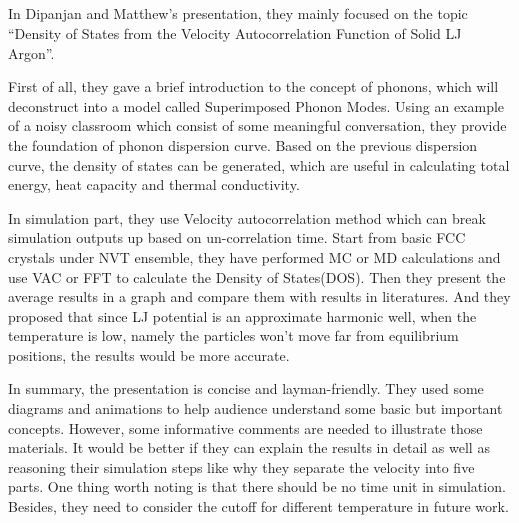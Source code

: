 \documentclass{article}
\begin{document}
\begin{spacing}{1.5}

\section*{}
In Dipanjan and Matthew’s presentation, they mainly focused on the topic “Density of States from the Velocity Autocorrelation Function of Solid LJ Argon”.

First of all, they gave a brief introduction to the concept of phonons, which will deconstruct into a model called Superimposed Phonon Modes. Using an example of a noisy classroom which consist of some meaningful conversation, they provide the foundation of phonon dispersion curve. Based on the previous dispersion curve, the density of states can be generated, which are useful in calculating total energy, heat capacity and thermal conductivity.

In simulation part, they use Velocity autocorrelation method which can break simulation outputs up based on un-correlation time. Start from basic FCC crystals under NVT ensemble, they have performed MC or MD calculations and use VAC or FFT to calculate the Density of States(DOS). Then they present the average results in a graph and compare them with results in literatures. And they proposed that since LJ potential is an approximate harmonic well, when the temperature is low, namely the particles won’t move far from equilibrium positions, the results would be more accurate.

In summary, the presentation is concise and layman-friendly.  They used some diagrams and animations to help audience understand some basic but important concepts. However, some informative comments are needed to illustrate those materials. It would be better if they can explain the results in detail as well as reasoning their simulation steps like why they separate the velocity into five parts. One thing worth noting is that there should be no time unit in simulation. Besides, they need to consider the cutoff for different temperature in future work.


\end{spacing}
\end{document}
